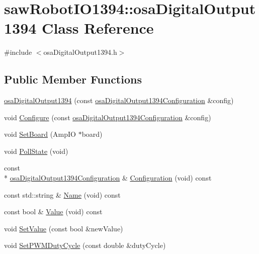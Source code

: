 \hypertarget{classsaw_robot_i_o1394_1_1osa_digital_output1394}{\section{saw\-Robot\-I\-O1394\-:\-:osa\-Digital\-Output1394 Class Reference}
\label{classsaw_robot_i_o1394_1_1osa_digital_output1394}
}


{\ttfamily \#include $<$osa\-Digital\-Output1394.\-h$>$}

\subsection*{Public Member Functions}
\begin{DoxyCompactItemize}
\item 
\hyperlink{classsaw_robot_i_o1394_1_1osa_digital_output1394_a4a9b9abda32f9e4ba17a42ff5c5ad3d7}{osa\-Digital\-Output1394} (const \hyperlink{structsaw_robot_i_o1394_1_1osa_digital_output1394_configuration}{osa\-Digital\-Output1394\-Configuration} \&config)
\item 
void \hyperlink{classsaw_robot_i_o1394_1_1osa_digital_output1394_a64b35cc32ac94be70815714a08f9a170}{Configure} (const \hyperlink{structsaw_robot_i_o1394_1_1osa_digital_output1394_configuration}{osa\-Digital\-Output1394\-Configuration} \&config)
\item 
void \hyperlink{classsaw_robot_i_o1394_1_1osa_digital_output1394_ac9d86409660d405edb19cb49fca8e73a}{Set\-Board} (Amp\-I\-O $\ast$board)
\item 
void \hyperlink{classsaw_robot_i_o1394_1_1osa_digital_output1394_ad6303dede482db64a41065b0997d564a}{Poll\-State} (void)
\item 
const \\*
\hyperlink{structsaw_robot_i_o1394_1_1osa_digital_output1394_configuration}{osa\-Digital\-Output1394\-Configuration} \& \hyperlink{classsaw_robot_i_o1394_1_1osa_digital_output1394_a8f6a78e2ec9a6c592e3aee3be451c566}{Configuration} (void) const 
\item 
const std\-::string \& \hyperlink{classsaw_robot_i_o1394_1_1osa_digital_output1394_a33b89fa497d4e8f98d3dafefd8545a98}{Name} (void) const 
\item 
const bool \& \hyperlink{classsaw_robot_i_o1394_1_1osa_digital_output1394_aafb1ed0dd748bef0dc11ac4d075f51f7}{Value} (void) const 
\item 
void \hyperlink{classsaw_robot_i_o1394_1_1osa_digital_output1394_a3abdbe357016241ea79f4487bb306caa}{Set\-Value} (const bool \&new\-Value)
\item 
void \hyperlink{classsaw_robot_i_o1394_1_1osa_digital_output1394_ae84ae12ebb442b9770f616b32c47723b}{Set\-P\-W\-M\-Duty\-Cycle} (const double \&duty\-Cycle)
\end{DoxyCompactItemize}
